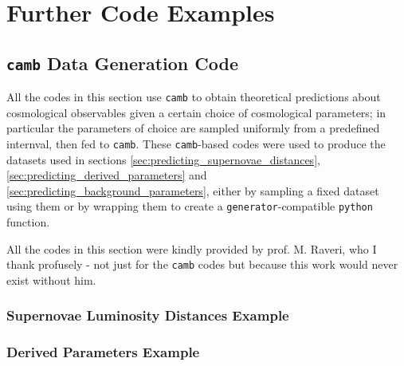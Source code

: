 \appendix
\chapter{Further Code Examples}\label{chp:code_snippets_appendix}
\section{\texttt{camb} Data Generation Code}
All the codes in this section use \texttt{camb} to obtain theoretical predictions about cosmological observables given a certain choice of cosmological parameters; in particular the parameters of choice are sampled uniformly from a predefined internval, then fed to \texttt{camb}. 
These \texttt{camb}-based codes were used to produce the datasets used in sections \ref{sec:predicting_supernovae_distances}, \ref{sec:predicting_derived_parameters} and \ref{sec:predicting_background_parameters}, either by sampling a fixed dataset using them or by wrapping them to create a \texttt{generator}-compatible \texttt{python} function.

All the codes in this section were kindly provided by prof. M. Raveri, who I thank profusely - not just for the \texttt{camb} codes but because this work would never exist without him.

\subsection{Supernovae Luminosity Distances Example}


\subsection{Derived Parameters Example}


